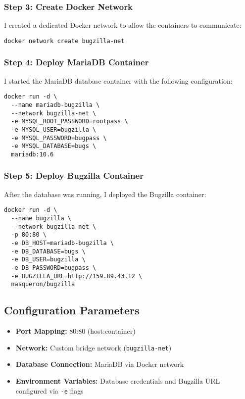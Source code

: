 \subsubsection{Step 3: Create Docker Network}
I created a dedicated Docker network to allow the containers to communicate:
\begin{verbatim}
docker network create bugzilla-net
\end{verbatim}

\subsubsection{Step 4: Deploy MariaDB Container}
I started the MariaDB database container with the following configuration:
\begin{verbatim}
docker run -d \
  --name mariadb-bugzilla \
  --network bugzilla-net \
  -e MYSQL_ROOT_PASSWORD=rootpass \
  -e MYSQL_USER=bugzilla \
  -e MYSQL_PASSWORD=bugpass \
  -e MYSQL_DATABASE=bugs \
  mariadb:10.6
\end{verbatim}

\subsubsection{Step 5: Deploy Bugzilla Container}
After the database was running, I deployed the Bugzilla container:
\begin{verbatim}
docker run -d \
  --name bugzilla \
  --network bugzilla-net \
  -p 80:80 \
  -e DB_HOST=mariadb-bugzilla \
  -e DB_DATABASE=bugs \
  -e DB_USER=bugzilla \
  -e DB_PASSWORD=bugpass \
  -e BUGZILLA_URL=http://159.89.43.12 \
  nasqueron/bugzilla
\end{verbatim}

\subsection{Configuration Parameters}
\begin{itemize}
    \item \textbf{Port Mapping:} 80:80 (host:container)
    \item \textbf{Network:} Custom bridge network (\texttt{bugzilla-net})
    \item \textbf{Database Connection:} MariaDB via Docker network
    \item \textbf{Environment Variables:} Database credentials and Bugzilla URL configured via \texttt{-e} flags
\end{itemize}

